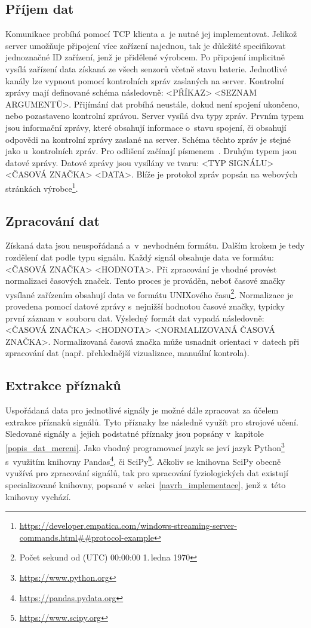     \subsection{Příjem dat}
    Komunikace probíhá pomocí TCP klienta a~je nutné jej implementovat. Jelikož server umožňuje připojení více zařízení najednou, tak je důležité specifikovat jednoznačné ID zařízení, jenž je přidělené výrobcem. Po připojení implicitně vysílá zařízení data získaná ze všech senzorů včetně stavu baterie. Jednotlivé kanály lze vypnout pomocí kontrolních zpráv zaslaných na server. Kontrolní zprávy mají definované schéma následovně: <PŘÍKAZ> <SEZNAM ARGUMENTŮ>. Přijímání dat probíhá neustále, dokud není spojení ukončeno, nebo pozastaveno kontrolní zprávou. Server vysílá dva typy zpráv. Prvním typem jsou informační zprávy, které obsahují informace o~stavu spojení, či obsahují odpovědi na kontrolní zprávy zaslané na server. Schéma těchto zpráv je stejné jako u~kontrolních zpráv. Pro odlišení začínají písmenem~. Druhým typem jsou datové zprávy. Datové zprávy jsou vysílány ve tvaru: <TYP SIGNÁLU> <ČASOVÁ ZNAČKA> <DATA>. Blíže je protokol zpráv popsán na webových stránkách výrobce\footnote{\url{https://developer.empatica.com/windows-streaming-server-commands.html##protocol-example}}.
    
    \subsection{Zpracování dat}
    Získaná data jsou neuspořádaná a~v~nevhodném formátu. Dalším krokem je tedy rozdělení dat podle typu signálu. Každý signál obsahuje data ve formátu: <ČASOVÁ ZNAČKA> <HODNOTA>. Při zpracování je vhodné provést normalizaci časových značek. Tento proces je prováděn, neboť časové značky vysílané zařízením obsahují data ve formátu UNIXového času\footnote{Počet sekund od (UTC) 00:00:00 1.\,ledna 1970}. Normalizace je provedena pomocí datové zprávy s~nejnižší hodnotou časové značky, typicky první záznam v~souboru dat. Výsledný formát dat vypadá následovně: <ČASOVÁ ZNAČKA> <HODNOTA> <NORMALIZOVANÁ ČASOVÁ ZNAČKA>. Normalizovaná časová značka může usnadnit orientaci v~datech při zpracování dat (např. přehlednější vizualizace, manuální kontrola).
    
    \subsection{Extrakce příznaků}
    Uspořádaná data pro jednotlivé signály je možné dále zpracovat za účelem extrakce příznaků signálů. Tyto příznaky lze následně využít pro strojové učení. Sledované signály a~jejich podstatné příznaky jsou popsány v~kapitole \ref{popis_dat_mereni}. Jako vhodný programovací jazyk se jeví jazyk Python\footnote{\url{https://www.python.org}} s~využitím knihovny Pandas\footnote{\url{https://pandas.pydata.org}}, či SciPy\footnote{\url{https://www.scipy.org}}. Ačkoliv se knihovna SciPy obecně využívá pro zpracování signálů, tak pro zpracování fyziologických dat existují specializované knihovny, popsané v~sekci~\ref{navrh_implementace}, jenž z~této knihovny vychází. 
    
